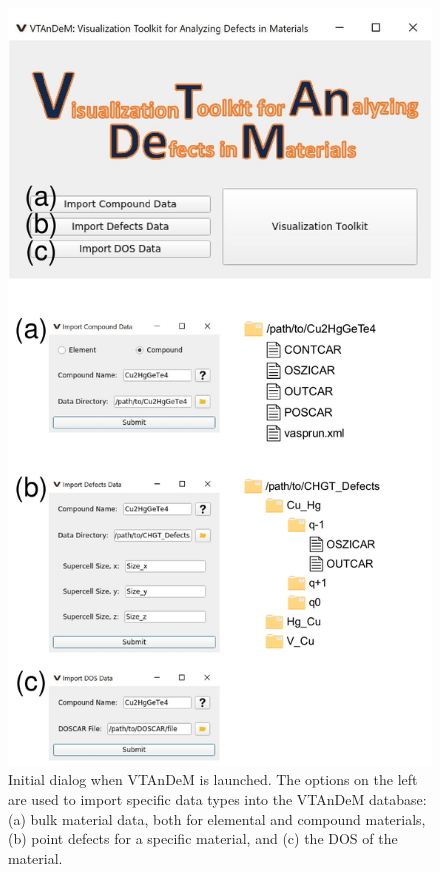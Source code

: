 \documentclass[%
 reprint,
 amsmath,amssymb,
 aps,
]{revtex4-1}
\begin{document}
\begin{figure}
\centering
\includegraphics[scale=0.45]{Upload_Interface_v4.pdf}
\caption{Initial dialog when VTAnDeM is launched. The options on the left are used to import specific data types into the VTAnDeM database: (a) bulk material data, both for elemental and compound materials, (b) point defects for a specific material, and (c) the DOS of the material.}
\label{Figure:Upload_Interface}
\end{figure}
\end{document}
